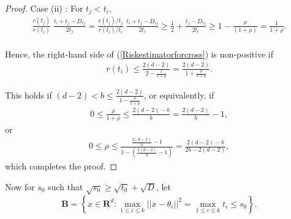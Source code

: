 \documentclass[11pt]{article}
\theoremstyle{definition}
\begin{document}
\begin{proof}
{Case (ii) \hspace{-1mm}:} For $t_j < t_i$, 
  \begin{align}
   \nonumber   \frac{r(t_j)}{r(t_i)}\; \frac{t_i + t_j - D_{ij}}{2t_j} =  \frac{r(t_j)/t_j}{r(t_i)/t_i} \; \frac{t_i + t_j - D_{ij}}{2t_i}  \geq \frac{1}{2} + \frac{t_j  - D_{ij}}{2t_i}\geq 1 - \frac{\rho }{(1 + \rho)} = \frac{1}{1 + \rho}.
  \end{align}
\\


Hence, the right-hand side of (\ref{Riskestimatorforcross}) is non-positive if
\begin{align}
   \nonumber  r(t_i) \leq \frac{2(d - 2)}{2 - \frac{1}{1 + \rho}} = \frac{2(d - 2)}{1 + \frac{\rho}{1 + \rho}}.
\end{align}

This holds if $(d - 2) < b \leq \frac{2(d - 2)}{1 - \frac{\rho}{1 + \rho}}$, or equivalently, if 
\begin{align*}
    0 \leq \frac{\rho}{1 + \rho} \leq \frac{2(d - 2) - b}{b} = \frac{2(d - 2) }{b} - 1,
\end{align*}
or
\begin{align}
    0 \leq  \rho \leq \frac{\frac{2(d- 2)}{b} - 1}{1 - \left(\frac{2(d- 2)}{b} - 1\right)} = \frac{2(d - 2) - b}{2b - 2(d - 2)},
  \label{rho_bound_new}
  \end{align}
which completes the proof.
\end{proof}

Now for $s_0$ such that $\sqrt{s_0} \ge  \sqrt{t_0} + \sqrt{D}$, let\\
    \begin{equation} 
    \textbf{B} = \left\{x \in \mathbf{R}^d: \max\limits_{1\leq i \leq k} ||x - \theta_i||^2 = \max\limits_{1\leq i \leq k} t_i  \le  s_0\right\}.
    \label{BCondition}
     \end{equation}
\end{document}
